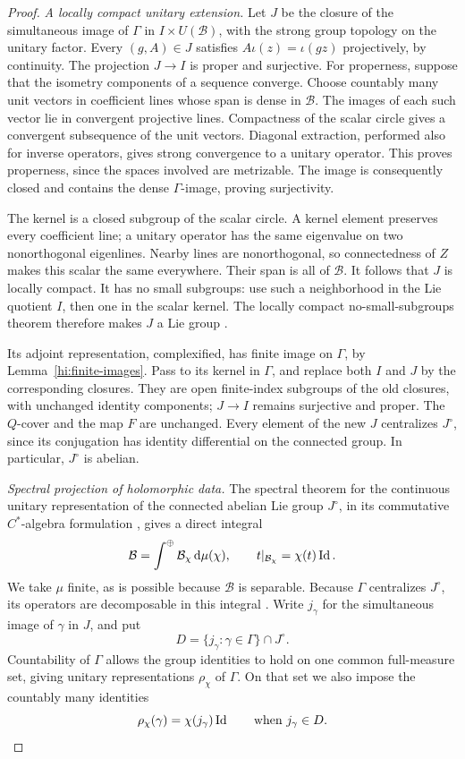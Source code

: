 \begin{proof}
\medskip\noindent\emph{A locally compact unitary extension.}
Let \(J\) be the closure of the simultaneous image of \(\Gamma\) in
\(I\times U(\mathcal B)\), with the strong group topology on the
unitary factor. Every \((g,A)\in J\) satisfies
\(A\iota(z)=\iota(gz)\) projectively, by continuity.
The projection \(J\to I\) is proper and surjective.
For properness, suppose that the isometry components of a sequence
converge. Choose countably many unit vectors in coefficient lines
whose span is dense in \(\mathcal B\). The images of each such
vector lie in convergent projective lines. Compactness of the
scalar circle gives a convergent subsequence of the unit vectors.
Diagonal extraction, performed also for inverse operators, gives
strong convergence to a unitary operator. This proves properness,
since the spaces involved are metrizable. The image is consequently
closed and contains the dense \(\Gamma\)-image, proving surjectivity.

The kernel is a closed subgroup of the scalar circle. A kernel
element preserves every coefficient line; a unitary operator has
the same eigenvalue on two nonorthogonal eigenlines. Nearby lines
are nonorthogonal, so connectedness of \(Z\) makes this scalar the
same everywhere. Their span is all of \(\mathcal B\).
It follows that \(J\) is locally compact. It has no small subgroups:
use such a neighborhood in the Lie quotient \(I\), then one in the
scalar kernel. The locally compact no-small-subgroups theorem
therefore makes \(J\) a Lie group
\cite[author's version, Corollary~1.5.8]{Tao2014}.

Its adjoint representation, complexified, has finite image on
\(\Gamma\), by Lemma~\ref{hi:finite-images}. Pass to its kernel in
\(\Gamma\), and replace both \(I\) and \(J\) by the corresponding
closures. They are open finite-index subgroups of the old closures,
with unchanged identity components; \(J\to I\) remains surjective
and proper. The \(Q\)-cover and the map \(F\) are unchanged.
Every element of the new \(J\) centralizes \(J^\circ\), since
its conjugation has identity differential on the connected group.
In particular, \(J^\circ\) is abelian.

\medskip\noindent\emph{Spectral projection of holomorphic data.}
The spectral theorem for the continuous unitary representation of
the connected abelian Lie group \(J^\circ\), in its commutative
\(C^*\)-algebra formulation \cite{Williams2007}, gives a direct integral
\[
 \mathcal B=\int^\oplus \mathcal B_\chi\,\mathrm d\mu(\chi),\qquad
 t|_{\mathcal B_\chi}=\chi(t)\operatorname{Id} .
\]
We take \(\mu\) finite, as is possible because \(\mathcal B\) is separable.
Because \(\Gamma\) centralizes \(J^\circ\), its operators are
decomposable in this integral \cite{Williams2007}.
Write \(j_\gamma\) for the simultaneous image of \(\gamma\) in \(J\),
and put
\[
 D=\{j_\gamma:\gamma\in\Gamma\}\cap J^\circ.
\]
Countability of \(\Gamma\) allows the group identities to hold on
one common full-measure set, giving unitary representations
\(\rho_\chi\) of \(\Gamma\). On that set we also impose the countably
many identities
\[
 \rho_\chi(\gamma)=\chi(j_\gamma)\operatorname{Id}
 \qquad\text{when }j_\gamma\in D.
\]


\end{proof}
